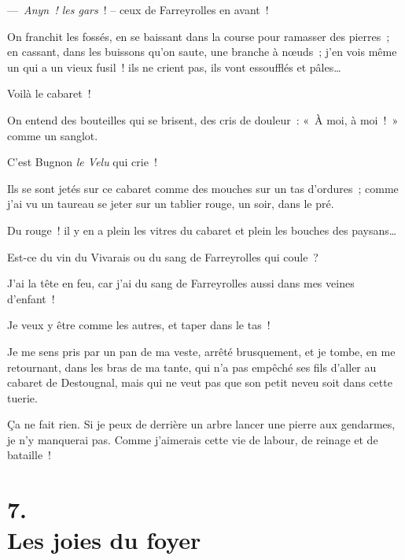 \documentclass[french,twoside]{book} %
\begin{document}
— \emph{Anyn ! les gars} ! – ceux de Farreyrolles en avant !\par
On franchit les fossés, en se baissant dans la course pour ramasser des pierres ; en cassant, dans les buissons qu’on saute, une branche à nœuds ; j’en vois même un qui a un vieux fusil ! ils ne crient pas, ils vont essoufflés et pâles…\par
Voilà le cabaret !\par
On entend des bouteilles qui se brisent, des cris de douleur : « À moi, à moi ! » comme un sanglot.\par
C’est Bugnon\emph{ le Velu} qui crie !\par
Ils se sont jetés sur ce cabaret comme des mouches sur un tas d’ordures ; comme j’ai vu un taureau se jeter sur un tablier rouge, un soir, dans le pré.\par
Du rouge ! il y en a plein les vitres du cabaret et plein les bouches des paysans…\par
Est-ce du vin du Vivarais ou du sang de Farreyrolles qui coule ?\par
J’ai la tête en feu, car j’ai du sang de Farreyrolles aussi dans mes veines d’enfant !\par
Je veux y être comme les autres, et taper dans le tas !\par
Je me sens pris par un pan de ma veste, arrêté brusquement, et je tombe, en me retournant, dans les bras de ma tante, qui n’a pas empêché ses fils d’aller au cabaret de Destougnal, mais qui ne veut pas que son petit neveu soit dans cette tuerie.\par
Ça ne fait rien. Si je peux de derrière un arbre lancer une pierre aux gendarmes, je n’y manquerai pas. Comme j’aimerais cette vie de labour, de reinage et de bataille !
\section[{7. Les joies du foyer}]{7. \\
Les joies du foyer}\renewcommand{\leftmark}{7. \\
Les joies du foyer}
\end{document}
